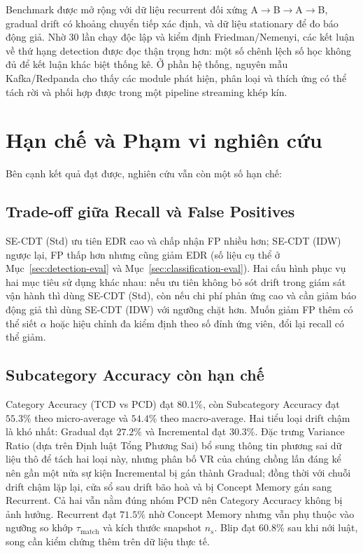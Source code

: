 Benchmark được mở rộng với dữ liệu recurrent đối xứng A$\to$B$\to$A$\to$B, gradual drift có khoảng chuyển tiếp xác định, và dữ liệu stationary để đo báo động giả. Nhờ 30 lần chạy độc lập và kiểm định Friedman/Nemenyi, các kết luận về thứ hạng detection được đọc thận trọng hơn: một số chênh lệch số học không đủ để kết luận khác biệt thống kê. Ở phần hệ thống, nguyên mẫu Kafka/Redpanda cho thấy các module phát hiện, phân loại và thích ứng có thể tách rời và phối hợp được trong một pipeline streaming khép kín.

\section{Hạn chế và Phạm vi nghiên cứu}

Bên cạnh kết quả đạt được, nghiên cứu vẫn còn một số hạn chế:

\subsection{Trade-off giữa Recall và False Positives}
SE-CDT (Std) ưu tiên EDR cao và chấp nhận FP nhiều hơn; SE-CDT (IDW) ngược lại, FP thấp hơn nhưng cũng giảm EDR (số liệu cụ thể ở Mục~\ref{sec:detection-eval} và Mục~\ref{sec:classification-eval}). Hai cấu hình phục vụ hai mục tiêu sử dụng khác nhau: nếu ưu tiên không bỏ sót drift trong giám sát vận hành thì dùng SE-CDT (Std), còn nếu chi phí phản ứng cao và cần giảm báo động giả thì dùng SE-CDT (IDW) với ngưỡng chặt hơn. Muốn giảm FP thêm có thể siết $\alpha$ hoặc hiệu chỉnh đa kiểm định theo số đỉnh ứng viên, đổi lại recall có thể giảm.

\subsection{Subcategory Accuracy còn hạn chế}
Category Accuracy (TCD vs PCD) đạt $80.1\%$, còn Subcategory Accuracy đạt $55.3\%$ theo micro-average và $54.4\%$ theo macro-average. Hai tiểu loại drift chậm là khó nhất: Gradual đạt $27.2\%$ và Incremental đạt $30.3\%$. Đặc trưng Variance Ratio (dựa trên Định luật Tổng Phương Sai) bổ sung thông tin phương sai dữ liệu thô để tách hai loại này, nhưng phân bố VR của chúng chồng lấn đáng kể nên gần một nửa sự kiện Incremental bị gán thành Gradual; đồng thời với chuỗi drift chậm lặp lại, cửa sổ sau drift bão hoà và bị Concept Memory gán sang Recurrent. Cả hai vẫn nằm đúng nhóm PCD nên Category Accuracy không bị ảnh hưởng. Recurrent đạt $71.5\%$ nhờ Concept Memory nhưng vẫn phụ thuộc vào ngưỡng so khớp $\tau_{\text{match}}$ và kích thước snapshot $n_s$. Blip đạt $60.8\%$ sau khi nới luật, song cần kiểm chứng thêm trên dữ liệu thực tế.

